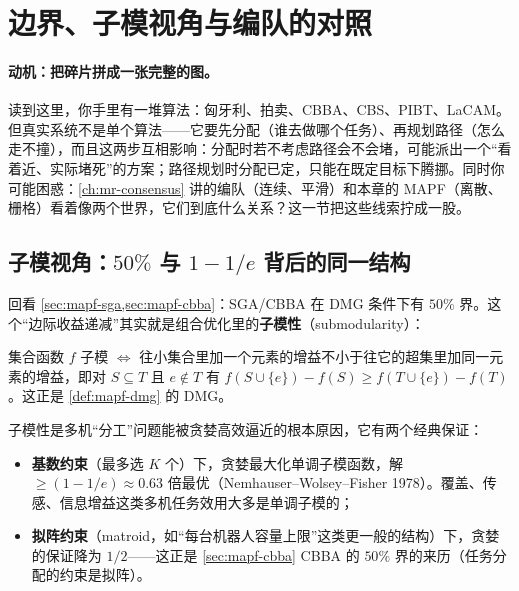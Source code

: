 \section{边界、子模视角与编队的对照}
\label{sec:mapf-submod}

\paragraph{动机：把碎片拼成一张完整的图。}
读到这里，你手里有一堆算法：匈牙利、拍卖、CBBA、CBS、PIBT、LaCAM。但真实系统不是单个算法——它要先分配（谁去做哪个任务）、再规划路径（怎么走不撞），而且这两步互相影响：分配时若不考虑路径会不会堵，可能派出一个“看着近、实际堵死”的方案；路径规划时分配已定，只能在既定目标下腾挪。同时你可能困惑：\cref{ch:mr-consensus} 讲的编队（连续、平滑）和本章的 MAPF（离散、栅格）看着像两个世界，它们到底什么关系？这一节把这些线索拧成一股。

\subsection{子模视角：$50\%$ 与 $1-1/e$ 背后的同一结构}
\label{sec:mapf-submod-theory}

回看 \cref{sec:mapf-sga,sec:mapf-cbba}：SGA/CBBA 在 DMG 条件下有 $50\%$ 界。这个“边际收益递减”其实就是组合优化里的\textbf{子模性}（submodularity）：

\begin{definition}[子模性]\label{def:mapf-submodular}
集合函数 $f$ 子模 $\iff$ 往小集合里加一个元素的增益不小于往它的超集里加同一元素的增益，即对 $S\subseteq T$ 且 $e\notin T$ 有 $f(S\cup\{e\})-f(S)\ge f(T\cup\{e\})-f(T)$。这正是 \cref{def:mapf-dmg} 的 DMG。
\end{definition}

子模性是多机“分工”问题能被贪婪高效逼近的根本原因，它有两个经典保证：

\begin{theorem}[子模贪婪的两个近似界]\label{thm:mapf-submod-bounds}
\begin{itemize}
  \item \textbf{基数约束}（最多选 $K$ 个）下，贪婪最大化单调子模函数，解 $\ge (1-1/e)\approx 0.63$ 倍最优（Nemhauser--Wolsey--Fisher 1978）\cite{nemhauser1978analysis}。覆盖、传感、信息增益这类多机任务效用大多是单调子模的；
  \item \textbf{拟阵约束}（matroid，如“每台机器人容量上限”这类更一般的结构）下，贪婪的保证降为 $1/2$——这正是 \cref{sec:mapf-cbba} CBBA 的 $50\%$ 界的来历（任务分配的约束是拟阵）。
\end{itemize}
\end{theorem}

